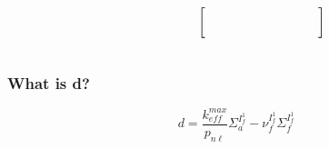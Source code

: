 \documentclass{beamer}
\def\w{\color{white}}
\begin{document}
\begin{frame}[shrink=25]
\begin{equation*}
\begin{blockarray}{cccccccccc}
\begin{block}{cc[cccccccc]}
                               & \w 1              & \w 1              &
                               &                   &                   &
             \\
                               & \w Opt            & \w 1              &
                               &                   &                   &
                               &                   &                   &
             \\
            \end{block}
        \end{blockarray}
    \end{equation*}

\end{frame}

\begin{frame}
\frametitle{What is d?}

    \begin{equation}
        d = \frac{k_{eff}^{max}}{p_{n\ell}} \Sigma_{a}^{I_{f}^{1}} - 
            \nu_{f}^{I_{f}^{1}} \Sigma_{f}^{I_{f}^{1}}
    \end{equation}

\end{frame}
\end{document}
